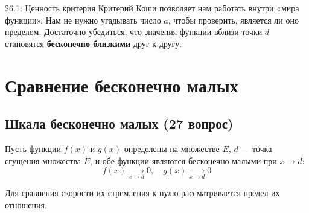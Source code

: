 \documentclass[a4paper,12pt]{article}
\begin{document}
	\begin{center}
	\end{center}
	
	\begin{notebook}{26.1: Ценность критерия}
		Критерий Коши позволяет нам работать внутри «мира функции». Нам не нужно угадывать число $a$, чтобы проверить, является ли оно пределом. Достаточно убедиться, что значения функции вблизи точки $d$ становятся \textbf{бесконечно близкими} друг к другу.
	\end{notebook}
	
	
	
	
	
	\newpage
	\section{Сравнение бесконечно малых}
	
	\subsection{Шкала бесконечно малых (27 вопрос)}
	
	Пусть функции $f(x)$ и $g(x)$ определены на множестве $E$, $d$ — точка сгущения множества $E$, и обе функции являются бесконечно малыми при $x \to d$:
	\[ f(x) \xrightarrow[x \to d]{} 0, \quad g(x) \xrightarrow[x \to d]{} 0 \]
	
	Для сравнения скорости их стремления к нулю рассматривается предел их отношения.
	
\end{document}
